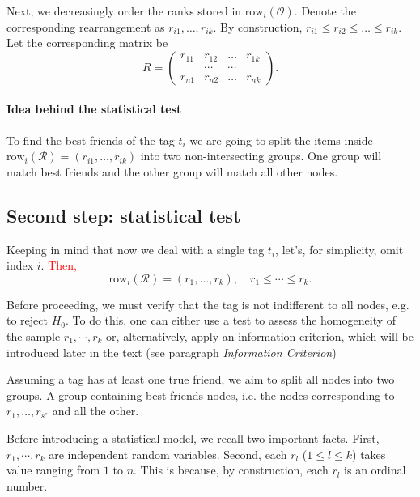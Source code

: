 Next, we decreasingly order the ranks stored in $\text{row}_i(\mathcal{O})$. Denote the corresponding rearrangement as $r_{i1}, \dots, r_{ik}$. By construction, $r_{i1} \le r_{i2} \le \dots \le r_{ik}$. Let the corresponding matrix be
\begin{equation}
\label{def:R}
R = \begin{pmatrix}
r_{11} & r_{12} & \dots & r_{1k} \\
 &\cdots & \cdots & \\
r_{n1} & r_{n2} & \dots & r_{nk}
\end{pmatrix}.
\end{equation}

\paragraph{Idea behind the statistical test} To find the best friends of the tag $t_i$ we are going to split the items inside $\text{row}_{i}(\mathcal{R}) = (r_{i1}, \dots, r_{ik})$ into two non-intersecting groups. One group will match best friends and the other group will match all other nodes. 

\subsection*{Second step: statistical test}
Keeping in mind that now we deal with a single tag $t_i$, let's, for simplicity, omit index $i$. \textcolor{red}{Then,} 
\[
\text{row}_{i}(\mathcal{R}) = (r_{1}, \dots, r_{k}), 
\quad
r_{1} \le \cdots \le r_{k}.
\]

Before proceeding, we must verify that the tag is not indifferent to all nodes, e.g. to reject $H_0$. To do this, one can either use a test to assess the homogeneity of the sample $r_{1}, \cdots, r_{k}$ or, alternatively, apply an information criterion, which will be introduced later in the text (see paragraph \textit{Information Criterion})

Assuming a tag has at least one true friend, we aim to split all nodes into two groups. A group containing best friends nodes, i.e. the nodes corresponding to $r_1, \dots, r_{s^*}$ and all the other.

Before introducing a statistical model, we recall two important facts. First, $r_{1}, \cdots, r_{k}$ are independent random variables. Second, each $r_l$ ($1\le l \le k$) takes value ranging from $1$ to $n$. This is because, by construction, each $r_l$ is an ordinal number.

